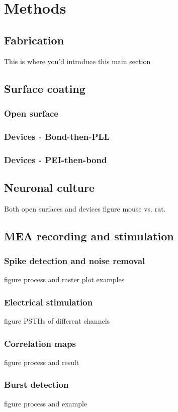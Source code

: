 \chapter{Methods}
\label{chap:methods}



	\section{Fabrication}

This is where you'd introduce this main section
    \section{Surface coating}
        \subsection{Open surface}
        \subsection{Devices - Bond-then-PLL}
        \subsection{Devices - PEI-then-bond}
    \section{Neuronal culture}
    Both open surfaces and devices
    figure mouse vs. rat.
    \section{MEA recording and stimulation}
        \subsection{Spike detection and noise removal}
        figure process and raster plot examples
        \subsection{Electrical stimulation}
        figure PSTHs of different channels
        \subsection{Correlation maps}
        figure process and result
        \subsection{Burst detection}
        figure process and example
